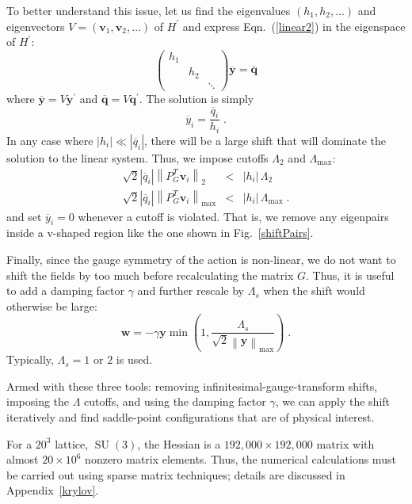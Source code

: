 \documentclass[preprint,aps,prd]{revtex4-2}
\newcommand{\be}{\begin{equation}}
\newcommand{\eq}{\end{equation}}
\newcommand{\heigen}{h}
\DeclareMathOperator{\SU}{SU}
\begin{document}
To better understand this issue, let us find the eigenvalues
$\left(\heigen_1, \heigen_2, \ldots\right)$ and
eigenvectors $V=\left(\mathbf{v}_1, \mathbf{v}_2, \ldots\right)$
of $H^\prime$ and express Eqn.~(\ref{linear2}) in the eigenspace of $H^\prime$:
\be
\begin{pmatrix}
    \heigen_1 & & \\
    & \heigen_2 & \\
    & & \ddots  \end{pmatrix} \overline{\mathbf{y}} =
  \overline{\mathbf{q}} \label{linear3}
\eq
where $\overline{\mathbf{y}} = V \mathbf{y}^\prime$ and
$\overline{\mathbf{q}}  = V \mathbf{q}^\prime$.
The solution is simply
\be
    \overline{y}_i = \frac{\overline{q}_i}{\heigen_i} \; .
\eq
In any case where $\left|\heigen_i\right|\ll
\left|\overline{q}_i\right|$,
there will be a large shift that will dominate the solution
to the linear system.
Thus, we impose cutoffs $\Lambda_2$ and $\Lambda_\mathrm{max}$:
\begin{eqnarray}
    \sqrt{2} \left|\overline{q}_i\right|\left\lVert P_G^T \mathbf{v}_i\right\rVert_2
     &<& \left|\heigen_i\right|\,\Lambda_2 \label{lambda2} \\
    \sqrt{2} \left|\overline{q}_i\right|
      \left\lVert P_G^T \mathbf{v}_i\right\rVert_\mathrm{max}
    &<& \left|\heigen_i\right|\,\Lambda_\mathrm{max} \; .
\end{eqnarray}
%
and set $\overline{y}_i=0$ whenever a cutoff is violated.
That is, we remove any eigenpairs inside a v-shaped
region like the one shown in Fig.~\ref{shiftPairs}.  

Finally, since the gauge symmetry of the action is non-linear,
we do not want to shift the fields by too much before recalculating
the matrix $G$.  
Thus, it is useful to add a damping factor $\gamma$ and
further rescale by $\Lambda_s$ when the shift would
otherwise be large:
\be
  \mathbf{w} = - \gamma \mathbf{y} \min\left(1, \frac{\Lambda_s}{
    \sqrt{2} \left\lVert \mathbf{y}\right\rVert_\mathrm{max}}\right) \; .
\eq
Typically, $\Lambda_s = 1$ or $2$ is used.

Armed with these three tools:  removing infinitesimal-gauge-transform shifts,
imposing the $\Lambda$ cutoffs, and using the damping factor $\gamma$,
we can apply the shift iteratively and find saddle-point configurations
that are of physical interest.  

For a $20^3$ lattice, $\SU(3)$, the Hessian is a
$192,000 \times 192,000$ matrix with almost $20\times 10^6$
nonzero matrix elements. Thus, the numerical calculations
must be carried out using sparse matrix techniques;
details are discussed in Appendix~\ref{krylov}.
\end{document}
